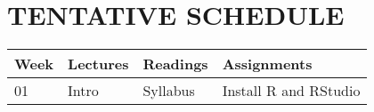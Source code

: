 \section*{TENTATIVE SCHEDULE}

\begin{center}
    \begin{tabular}{llll}
        \toprule
        \textbf{Week} & \textbf{Lectures} & \textbf{Readings} & \textbf{Assignments} \\
        \midrule
        01 & Intro & Syllabus & Install R and RStudio \\
        \bottomrule
    \end{tabular}
\end{center}